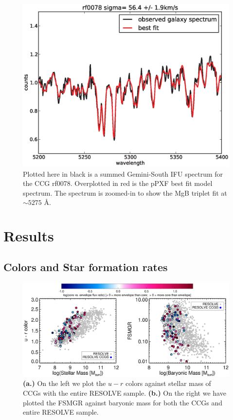 \documentclass[iop,apj]{emulateapj}
\begin{document}
\begin{figure}[hbpt!]
\begin{center}
\includegraphics[scale=0.4]{rf0078ppxffit.eps}
\caption{Plotted here in black is a summed Gemini-South IFU spectrum for the CCG rf0078. Overplotted in red is the pPXF best fit model spectrum. The spectrum is zoomed-in to show the MgB triplet fit at $\sim 5275$ \AA.}
\label{fig:ppxffit}
\end{center}
\end{figure}

\section{Results}
\label{results}
\subsection{Colors and Star formation rates}

\begin{figure}[hbpt!]
\begin{center}
\includegraphics[scale=0.65]{sfr_mbary.eps}
\caption{\textbf{(a.)} On the left we plot the $u-r$ colors against stellar mass of CCGs with the entire RESOLVE sample. \textbf{(b.)} On the right we have plotted the FSMGR against baryonic mass for both the CCGs and entire RESOLVE sample. }
\label{fig:fsmgr}
\end{center}
\end{figure}
\end{document}
